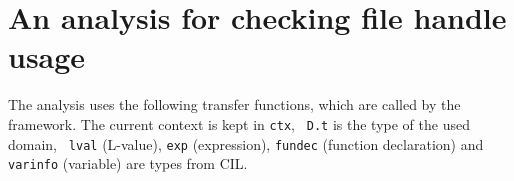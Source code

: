 \section{An analysis for checking file handle usage}
The analysis uses the following transfer functions, which are called by the framework. The current context is kept in \verb|ctx|, \verb| D.t| is the type of the used domain, \verb| lval| (L-value), \verb|exp| (expression), \verb|fundec| (function declaration) and \verb|varinfo| (variable) are types from CIL.
